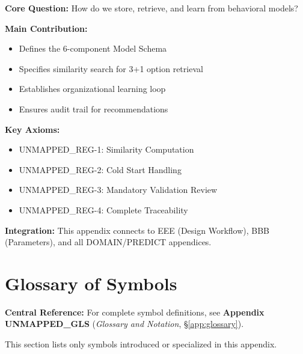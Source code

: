 \begin{tcolorbox}[colback=green!10!white, colframe=green!75!black,
    title=\textbf{Appendix UNMAPPED_REG: Summary}]

\textbf{Core Question:} How do we store, retrieve, and learn from behavioral models?

\textbf{Main Contribution:}
\begin{itemize}[nosep]
    \item Defines the 6-component Model Schema
    \item Specifies similarity search for 3+1 option retrieval
    \item Establishes organizational learning loop
    \item Ensures audit trail for recommendations
\end{itemize}

\textbf{Key Axioms:}
\begin{itemize}[nosep]
    \item UNMAPPED_REG-1: Similarity Computation
    \item UNMAPPED_REG-2: Cold Start Handling
    \item UNMAPPED_REG-3: Mandatory Validation Review
    \item UNMAPPED_REG-4: Complete Traceability
\end{itemize}

\textbf{Integration:} This appendix connects to EEE (Design Workflow),
BBB (Parameters), and all DOMAIN/PREDICT appendices.

\end{tcolorbox}


\section{Glossary of Symbols}
\label{sec:fff-glossary}

\begin{tcolorbox}[colback=blue!5!white, colframe=blue!75!black]
\textbf{Central Reference:} For complete symbol definitions, see
\textbf{Appendix UNMAPPED_GLS} (\textit{Glossary and Notation}, \S\ref{app:glossary}).

This section lists only symbols introduced or specialized in this appendix.
\end{tcolorbox}

\vspace{0.5em}

